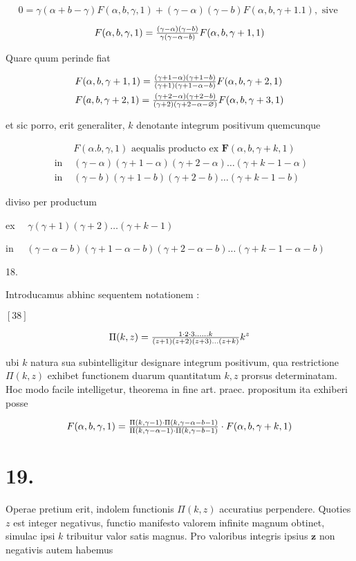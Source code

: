\documentclass[twoside,12pt, showframe]{memoir}
\let\oldfrac\frac
\def\frac#1#2{\mathchoice{\tfrac{#1}{#2}}{\oldfrac{#1}{#2}}{\genfrac{}{}{}{2}{#1}{#2\mathstrut}}{\genfrac{}{}{}{3}{#1}{#2\mathstrut}}}
\begin{document}
\[
0=\gamma(\alpha+b-\gamma) F(\alpha, b, \gamma, 1)+(\gamma-\alpha)(\gamma-b) F(\alpha, b, \gamma+1.1), \text { sive }
\]

\[
F(\alpha, b, \gamma, 1)=\frac{(\gamma-\alpha)(\gamma-b)}{\gamma(\gamma-\alpha-b)} F(\alpha, b, \gamma+1,1)
\]

Quare quum perinde fiat

\[
\begin{aligned}
& F(\alpha, b, \gamma+1,1)=\frac{(\gamma+1-\alpha)(\gamma+1-b)}{(\gamma+1)(\gamma+1-\alpha-b)} F(\alpha, b, \gamma+2,1) \\
& F(a, b, \gamma+2,1)=\frac{(\gamma+2-\alpha)(\gamma+2-b)}{(\gamma+2)(\gamma+2-\alpha-\varnothing)} F(\alpha, b, \gamma+3,1)
\end{aligned}
\]

et sic porro, erit generaliter, \(k\) denotante integrum positivum quemcunque

\[
\begin{aligned}
& F(\alpha . b, \gamma, 1) \text { aequalis producto ex } \boldsymbol{F}(\alpha, b, \gamma+k, 1) \\
\text { in } & (\gamma-\alpha)(\gamma+1-\alpha)(\gamma+2-\alpha) \ldots(\gamma+k-1-\alpha) \\
\text { in } & (\gamma-b)(\gamma+1-b)(\gamma+2-b) \ldots(\gamma+k-1-b)
\end{aligned}
\]

diviso per productum

ex \(\quad \gamma(\gamma+1)(\gamma+2) \ldots(\gamma+k-1)\)

in \(\quad(\gamma-\alpha-b)(\gamma+1-\alpha-b)(\gamma+2-\alpha-b) \ldots(\gamma+k-1-\alpha-b)\)

18.

Introducamus abhinc sequentem notationem :

\([38]\)

\[
\Pi(k, z)=\frac{1 \cdot 2 \cdot 3 \ldots \ldots k}{(z+1)(z+2)(z+3) \ldots(z+k)} k^{z}
\]

ubi \(k\) natura sua subintelligitur designare integrum positivum, qua restrictione \(\Pi(k, z)\) exhibet functionem duarum quantitatum \(k, z\) prorsus determinatam. Hoc modo facile intelligetur, theorema in fine art. praec. propositum ita exhiberi posse

\[
F(\alpha, b, \gamma, 1)=\frac{\Pi(k, \gamma-1) \cdot \Pi(k, \gamma-\alpha-b-1)}{\Pi(k, \gamma-\alpha-1) \cdot \Pi(k, \gamma-b-1)} \cdot F(\alpha, b, \gamma+k, 1)
\]

\section*{19.}
Operae pretium erit, indolem functionis \(\Pi(k, z)\) accuratius perpendere. Quoties \(z\) est integer negativus, functio manifesto valorem infinite magnum obtinet, simulac ipsi \(k\) tribuitur valor satis magnus. Pro valoribus integris ipsius \(\boldsymbol{z}\) non negativis autem habemus
\end{document}
